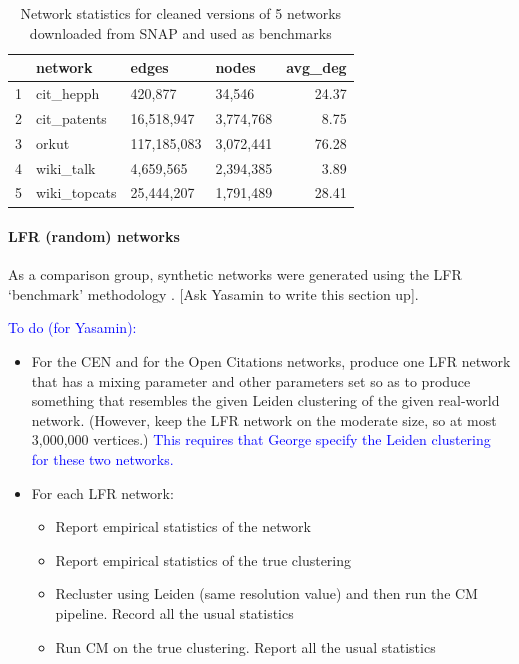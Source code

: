 \documentclass[12pt, oneside]{article}   	%
\begin{document}
\begin{table}[ht]
\centering
\begin{tabular}{rlllr}
  \hline
 & network & edges & nodes & avg\_deg \\ 
  \hline
  1 & cit\_hepph & 420,877 & 34,546 & 24.37 \\ 
  2 & cit\_patents & 16,518,947 & 3,774,768 & 8.75 \\ 
  3 & orkut & 117,185,083 & 3,072,441 & 76.28 \\ 
  4 & wiki\_talk & 4,659,565 & 2,394,385 & 3.89 \\ 
  5 & wiki\_topcats & 25,444,207 & 1,791,489 & 28.41 \\ 
   \hline
\end{tabular}
\caption{Network statistics for cleaned versions of 5 networks downloaded from SNAP and used as benchmarks}
\end{table}

\paragraph{LFR (random) networks}
As a comparison group, synthetic networks were generated using the LFR `benchmark' methodology \citep{Lancichinetti2008}. [Ask Yasamin to write this section up].

\textcolor{blue}{
To do (for Yasamin):}

\begin{itemize}
\item For  the CEN and  for the Open Citations networks, produce one LFR network  that has a mixing parameter and other
parameters set so as to produce something that resembles the given Leiden clustering of the given real-world network. (However, keep the LFR network
on the moderate size, so at most 3,000,000 vertices.) 
\textcolor{blue}{This requires that George specify the Leiden clustering for these two networks.}
\item 
For each LFR network: 
\begin{itemize}
\item Report empirical statistics of the network
\item Report empirical statistics of the true clustering 
\item 
Recluster using Leiden (same resolution value) and then run the CM pipeline.
Record all the usual statistics
\item Run CM on the true clustering.
Report all the usual statistics
\end{itemize}
\end{itemize}
\end{document}
